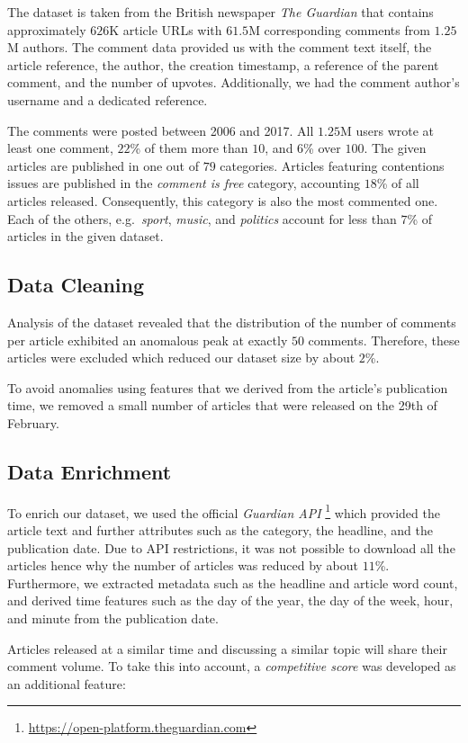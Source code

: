 The dataset is taken from the British newspaper \textit{The Guardian} that contains approximately $626$K article URLs with $61.5$M corresponding comments from $1.25$M authors.
The comment data provided us with the comment text itself, the article reference, the author, the creation timestamp, a reference of the parent comment, and the number of upvotes. Additionally, we had the comment author's username and a dedicated reference.

The comments were posted between 2006 and 2017. All $1.25$M users wrote at least one comment, $22$\% of them more than $10$, and $6$\% over $100$.
The given articles are published in one out of $79$ categories. 
Articles featuring contentions issues are published in the \textit{comment is free} category, accounting $18$\% of all articles released.
Consequently, this category is also the most commented one. 
Each of the others, e.g.\ \textit{sport}, \textit{music}, and \textit{politics} account for less than $7$\% of articles in the given dataset.

\subsection{Data Cleaning}
Analysis of the dataset revealed that the distribution of the number of comments per article exhibited an anomalous peak at exactly $50$ comments. 
Therefore, these articles were excluded which reduced our dataset size by about $2$\%.

To avoid anomalies using features that we derived from the article's publication time, we removed a small number of articles that were released on the 29th of February.

\subsection{Data Enrichment}
To enrich our dataset, we used the official \textit{Guardian API} \footnote{\url{https://open-platform.theguardian.com}} which provided the article text and further attributes such as the category, the headline, and the publication date.
Due to API restrictions, it was not possible to download all the articles hence why the number of articles was reduced by about $11$\%.
Furthermore, we extracted metadata such as the headline and article word count, and derived time features such as the day of the year, the day of the week, hour, and minute from the publication date.

Articles released at a similar time and discussing a similar topic will share their comment volume. To take this into account, a \textit{competitive score} was developed as an additional feature:


